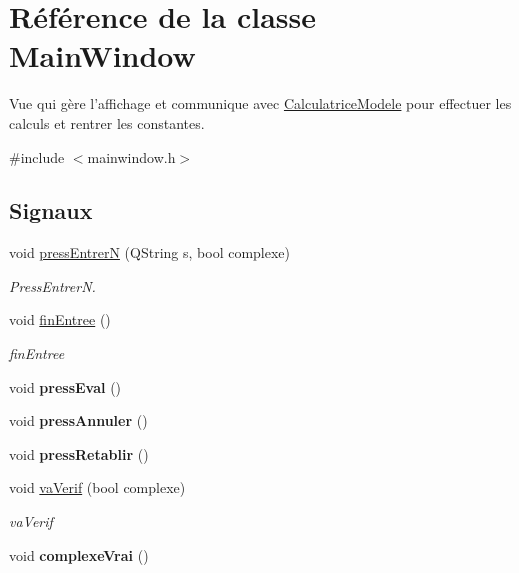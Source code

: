 \hypertarget{class_main_window}{\section{Référence de la classe Main\-Window}
\label{class_main_window}
}


Vue qui gère l'affichage et communique avec \hyperlink{class_calculatrice_modele}{Calculatrice\-Modele} pour effectuer les calculs et rentrer les constantes.  




{\ttfamily \#include $<$mainwindow.\-h$>$}

\subsection*{Signaux}
\begin{DoxyCompactItemize}
\item 
void \hyperlink{class_main_window_ad223a3e425426fd76e3d40080096fc10}{press\-Entrer\-N} (Q\-String s, bool complexe)
\begin{DoxyCompactList}\small\item\em Press\-Entrer\-N. \end{DoxyCompactList}\item 
void \hyperlink{class_main_window_a7e430740aeaadb6d0d10514c979dab1a}{fin\-Entree} ()
\begin{DoxyCompactList}\small\item\em fin\-Entree \end{DoxyCompactList}\item 
\hypertarget{class_main_window_a95d2cfe9f1036d1dbbaad6d3f6504d1e}{void {\bfseries press\-Eval} ()}\label{class_main_window_a95d2cfe9f1036d1dbbaad6d3f6504d1e}

\item 
\hypertarget{class_main_window_aaf9db67eaf775db8b0bc1e066a844994}{void {\bfseries press\-Annuler} ()}\label{class_main_window_aaf9db67eaf775db8b0bc1e066a844994}

\item 
\hypertarget{class_main_window_a0e0214f53b83522b6fb4a513fdde0a56}{void {\bfseries press\-Retablir} ()}\label{class_main_window_a0e0214f53b83522b6fb4a513fdde0a56}

\item 
void \hyperlink{class_main_window_a66c446d0640d30361b96193e9599482b}{va\-Verif} (bool complexe)
\begin{DoxyCompactList}\small\item\em va\-Verif \end{DoxyCompactList}\item 
\hypertarget{class_main_window_ac966ffc012ed7b3df4615f4449281cec}{void {\bfseries complexe\-Vrai} ()}\label{class_main_window_ac966ffc012ed7b3df4615f4449281cec}


\end{DoxyCompactItemize}

